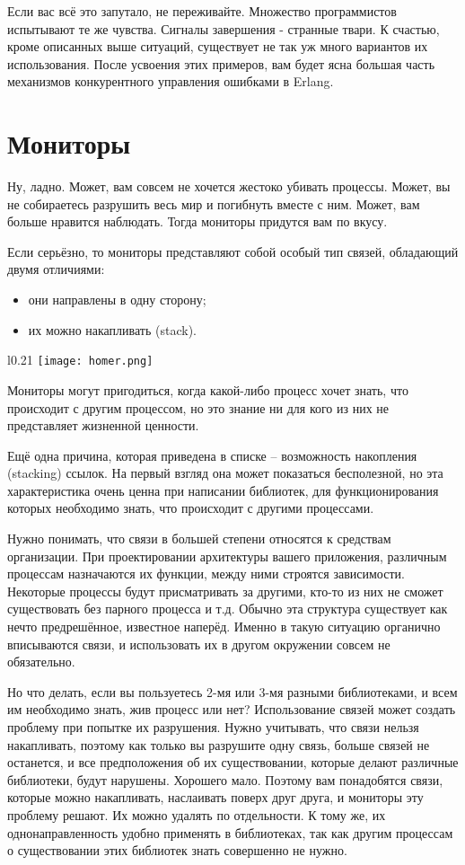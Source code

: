 Если вас всё это запутало, не переживайте.
Множество программистов испытывают те же чувства.
Сигналы завершения \-- странные твари.
К счастью, кроме описанных выше ситуаций, существует не так уж много вариантов их использования.
После усвоения этих примеров, вам будет ясна большая часть механизмов конкурентного управления ошибками в Erlang.
\section{Мониторы}
\label{monitors}
Ну, ладно.
Может, вам совсем не хочется жестоко убивать процессы.
Может, вы не собираетесь разрушить весь мир и погибнуть вместе с ним.
Может, вам больше нравится наблюдать.
Тогда мониторы придутся вам по вкусу.

Если серьёзно, то мониторы представляют собой особый тип связей, обладающий двумя отличиями:
\begin{itemize}
    \item они направлены в одну сторону;
    \item их можно накапливать (stack).
\end{itemize}

\begin{wrapfigure}{l}{0.21\linewidth}
    \texttt{[image: homer.png]}
\end{wrapfigure}

Мониторы могут пригодиться, когда какой\--либо процесс хочет знать, что происходит с другим  процессом, но это знание ни для кого из них не представляет жизненной ценности.

Ещё одна причина, которая приведена в списке \--- возможность накопления (stacking) ссылок.
На первый взгляд она может показаться бесполезной, но эта характеристика очень ценна при написании библиотек, для функционирования которых необходимо знать, что происходит с другими процессами.

Нужно понимать, что связи в большей степени относятся к средствам организации.
При проектировании архитектуры вашего приложения, различным процессам назначаются их функции, между ними строятся зависимости.
Некоторые процессы будут присматривать за другими, кто\--то из них не сможет существовать без парного процесса и т.д.
Обычно эта структура существует как нечто предрешённое, известное наперёд.
Именно в такую ситуацию органично вписываются связи, и использовать их в другом окружении совсем не обязательно.

Но что делать, если вы пользуетесь 2\--мя или 3\--мя разными библиотеками, и всем им необходимо знать, жив процесс или нет?
Использование связей может создать проблему при попытке их разрушения.
Нужно учитывать, что связи нельзя накапливать, поэтому как только вы разрушите одну связь, больше связей не останется, и все предположения об их существовании, которые делают различные библиотеки, будут нарушены.
Хорошего мало.
Поэтому вам понадобятся связи, которые можно накапливать, наслаивать поверх друг друга, и мониторы эту проблему решают.
Их можно удалять по отдельности.
К тому же, их однонаправленность удобно применять в библиотеках, так как другим процессам о существовании этих библиотек знать совершенно не нужно.

